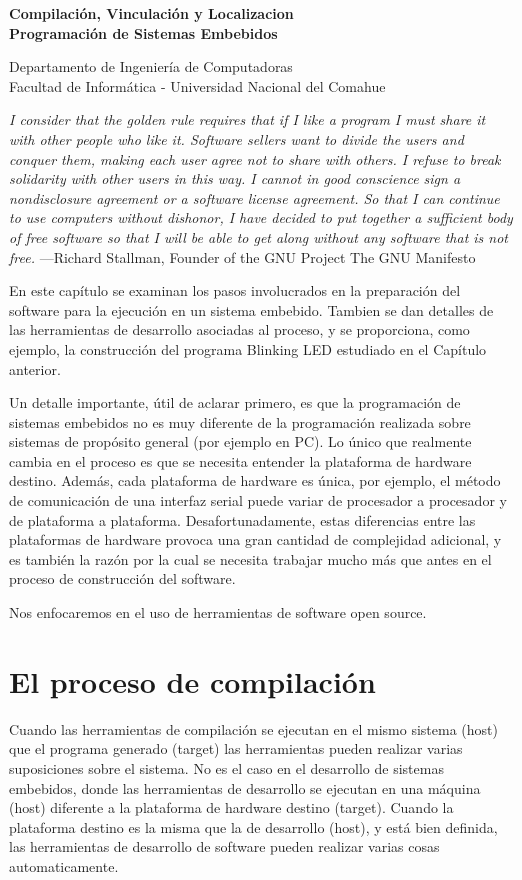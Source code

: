 \documentclass[12pt]{article}
\def\maketitle{

 \makeatletter
 {\color{bl} \centering \huge \sc \textbf{
 Compilación, Vinculación y Localizacion\\ 
\large \vspace*{-8pt} \color{black} Programación de Sistemas Embebidos
 \vspace*{8pt} }\par}
 \makeatother


 \makeatletter
 {\centering \small 
 	Departamento de Ingeniería de Computadoras \\
 	Facultad de Informática - Universidad Nacional del Comahue \\
 	\vspace{20pt} }
 \makeatother

}
\begin{document}
\thispagestyle{empty}
\maketitle
\setlength{\parindent}{0pt}

{\it I consider that the golden rule requires that if I like a program I must share it with other people who like
it. Software sellers want to divide the users and conquer them, making each user agree not to share with
others. I refuse to break solidarity with other users in this way. I cannot in good conscience sign a
nondisclosure agreement or a software license agreement. So that I can continue to use computers
without dishonor, I have decided to put together a sufficient body of free software so that I will be able
to get along without any software that is not free.}
—Richard Stallman, Founder of the GNU Project The GNU Manifesto


En este capítulo se examinan los pasos involucrados en la preparación
del software para la ejecución en un sistema embebido.
Tambien se dan detalles de las herramientas de desarrollo asociadas
al proceso, y se proporciona, como ejemplo, la
construcción del programa Blinking LED estudiado en el Capítulo anterior.

Un detalle importante, útil de aclarar primero, es que la programación
de sistemas embebidos no es muy diferente de la programación
realizada sobre sistemas de propósito general (por ejemplo en PC).
Lo único que realmente cambia en el proceso es que se necesita 
entender la plataforma de hardware destino. Además, cada 
plataforma de hardware es única, por ejemplo, el método de comunicación
de una interfaz serial puede variar de procesador a procesador y de plataforma
a plataforma.
Desafortunadamente, estas diferencias entre las plataformas de hardware
provoca una gran cantidad de complejidad adicional, y es también la razón
por la cual se necesita trabajar mucho más que antes en el proceso de construcción
del software.

Nos enfocaremos en el uso de herramientas de software open source.


\section *{El proceso de compilación}

Cuando las herramientas de compilación se ejecutan en el mismo sistema (host)
que el programa generado (target) las herramientas pueden realizar
varias suposiciones sobre el sistema.
No es el caso en el desarrollo de sistemas embebidos, donde las herramientas
de desarrollo se ejecutan en una máquina (host) diferente a la plataforma
de hardware destino (target).
Cuando la plataforma destino es la misma que la de desarrollo (host), y está
bien definida, las herramientas de
desarrollo de software pueden realizar varias cosas automaticamente.
 
\end{document}
